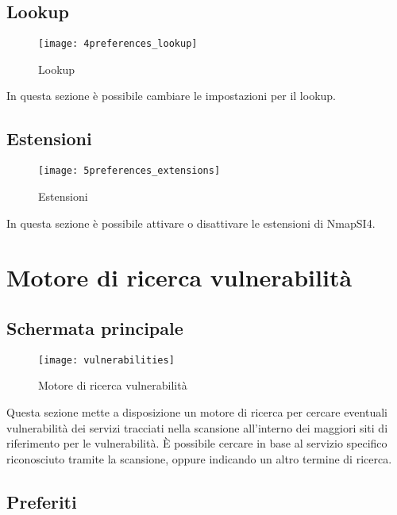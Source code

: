 \section{Lookup}
\label{sec_PreferencesLookup}

\begin{figure}[h]
  \centering
  \texttt{[image: 4preferences\_lookup]}
  \caption{Lookup}
  \label{fig:PreferencesLookup}
\end{figure}
In questa sezione \`e possibile cambiare le impostazioni per il lookup.

\section{Estensioni}
\label{sec:PreferencesExtensions}

\begin{figure}[h]
  \centering
  \texttt{[image: 5preferences\_extensions]}
  \caption{Estensioni}
  \label{fig:PreferencesExtensions}
\end{figure}
In questa sezione \`e possibile attivare o disattivare le estensioni di NmapSI4.

\chapter{Motore di ricerca vulnerabilit\`a}
\label{ch:Vulnerability}

\section{Schermata principale}
\label{sec:VulnerabilityMain}

\begin{figure}[h]
  \centering
  \texttt{[image: vulnerabilities]}
  \caption{Motore di ricerca vulnerabilit\`a}
  \label{fig:VulnerabilityMain}
\end{figure}
Questa sezione mette a disposizione un motore di ricerca per cercare eventuali 
vulnerabilit\`a dei servizi tracciati nella scansione all'interno dei maggiori 
siti di riferimento per le vulnerabilit\`a. \`E possibile cercare in base al 
servizio specifico riconosciuto tramite la scansione, oppure indicando un altro 
termine di ricerca.

\section{Preferiti}
\label{sec:VulnerabilityBookmarks}

